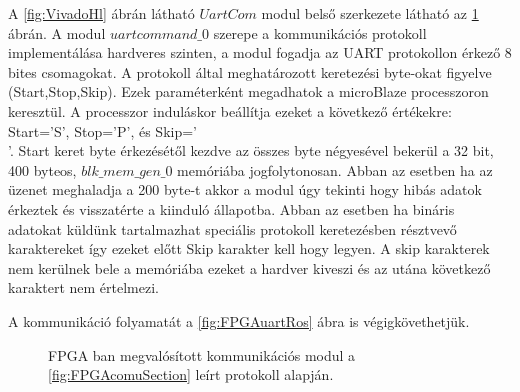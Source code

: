 A \ref{fig:VivadoHl} ábrán látható $UartCom$ modul belső szerkezete látható az \ref{fig:UartComVivaldo} ábrán. A modul $uartcommand\_0$ szerepe a kommunikációs protokoll implementálása hardveres szinten, a modul fogadja az UART protokollon  érkező 8 bites csomagokat. A protokoll által meghatározott keretezési byte-okat figyelve (Start,Stop,Skip). Ezek paraméterként megadhatok a microBlaze processzoron keresztül. A processzor induláskor beállítja ezeket a következő értékekre: Start='S', Stop='P', és Skip='\\'. 
Start keret byte érkezésétől kezdve az összes byte négyesével bekerül a 32 bit, 400 byteos, $blk\_mem\_gen\_0$ memóriába jogfolytonosan. Abban az esetben ha az üzenet meghaladja a 200 byte-t akkor a modul úgy tekinti hogy hibás adatok érkeztek és visszatérte a kiinduló állapotba. Abban az esetben ha bináris adatokat küldünk tartalmazhat speciális protokoll keretezésben résztvevő karaktereket így ezeket előtt Skip karakter kell hogy legyen. A skip karakterek nem kerülnek bele a memóriába ezeket a hardver kiveszi és az utána következő karaktert nem értelmezi.

A kommunikáció folyamatát a \ref{fig:FPGAuartRos} ábra is végigkövethetjük.

\begin{figure}[H]		
  \caption{FPGA ban megvalósított kommunikációs modul a 	     \ref{fig:FPGAcomuSection} leírt protokoll alapján.}
  \label{fig:UartComVivaldo}
\end{figure}


